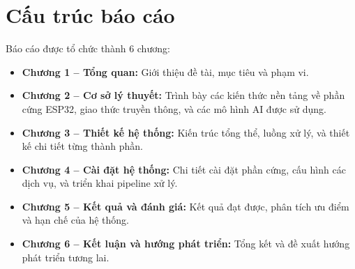 \section{Cấu trúc báo cáo}

Báo cáo được tổ chức thành 6 chương:

\begin{itemize}
\item \textbf{Chương 1 -- Tổng quan:} Giới thiệu đề tài, mục tiêu và phạm vi.
\item \textbf{Chương 2 -- Cơ sở lý thuyết:} Trình bày các kiến thức nền tảng
  về phần cứng ESP32, giao thức truyền thông, và các mô hình AI được sử dụng.
\item \textbf{Chương 3 -- Thiết kế hệ thống:} Kiến trúc tổng thể,
  luồng xử lý, và thiết kế chi tiết từng thành phần.
\item \textbf{Chương 4 -- Cài đặt hệ thống:} Chi tiết cài đặt phần cứng,
  cấu hình các dịch vụ, và triển khai pipeline xử lý.
\item \textbf{Chương 5 -- Kết quả và đánh giá:} Kết quả đạt được,
  phân tích ưu điểm và hạn chế của hệ thống.
\item \textbf{Chương 6 -- Kết luận và hướng phát triển:} Tổng kết
  và đề xuất hướng phát triển tương lai.
\end{itemize}
